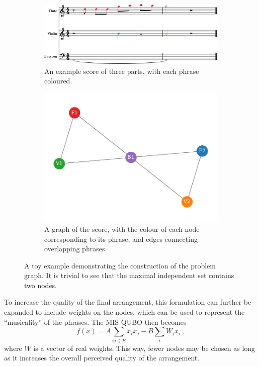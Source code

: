 \documentclass[aps,pra,10pt,twocolumn]{revtex4-2}
\begin{document}
\begin{figure}[t]
    \centering
    \begin{subfigure}[b]{\linewidth}
        \includegraphics[width=\linewidth]{../Figures/toy-1.png}
        \caption{An example score of three parts, with each phrase coloured.}
        \label{fig:simple-excerpt}
    \end{subfigure}
    \par\bigskip
    \begin{subfigure}[b]{\linewidth}
        \includegraphics[width=\linewidth]{../Figures/toy_graph.pdf}
        \caption{A graph of the score, with the colour of each node corresponding to its phrase, and edges connecting overlapping phrases.}
        \label{fig:simple-graph}
    \end{subfigure}
    \caption{A toy example demonstrating the construction of the problem graph. It is trivial to see that the maximal independent set contains two nodes.}
    \label{fig:toy}
\end{figure}

To increase the quality of the final arrangement, this formulation can further be expanded to include weights on the nodes, which can be used to represent the ``musicality'' of the phrases. The MIS QUBO then becomes
\begin{equation}
    f(x)=A\sum_{ij\in E}x_ix_j-B\sum_i W_ix_i\,,
    \label{eq:weightedMIS}
\end{equation}
where $W$ is a vector of real weights. This way, fewer nodes may be chosen as long as it increases the overall perceived quality of the arrangement. 
\end{document}
